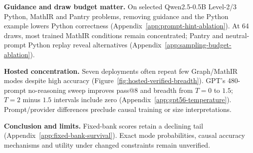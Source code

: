 \noindent\textbf{Guidance and draw budget matter.}
On selected Qwen2.5-0.5B Level-2/3 Python, MathIR and Pantry problems,
removing guidance and the Python example lowers Python correctness (Appendix~\ref{app:prompt-hint-ablation}).
At 64 draws, most trained MathIR conditions remain concentrated; Pantry and
neutral-prompt Python replay reveal alternatives (Appendix~\ref{app:sampling-budget-ablation}).

\noindent\textbf{Hosted concentration.}
\label{sec:hosted-concentration}
Seven deployments often repeat few Graph/MathIR modes despite high accuracy
(Figure~\ref{fig:hosted-verified-breadth}). GPT's 480-prompt no-reasoning sweep
improves pass@8 and breadth from $T=0$ to $1.5$; $T=2$ minus $1.5$ intervals
include zero (Appendix~\ref{app:gpt56-temperature}). Prompt/provider differences
preclude causal training or size interpretations.

\noindent\textbf{Conclusion and limits.}
\label{sec:conclusion}\label{sec:discussion}\label{sec:limitations}
Fixed-bank scores retain a declining tail (Appendix~\ref{app:fixed-bank-survival}).
Exact mode probabilities, causal accuracy mechanisms and utility under changed
constraints remain unverified.

\label{main:lastpage}

\clearpage


\clearpage
\appendix


